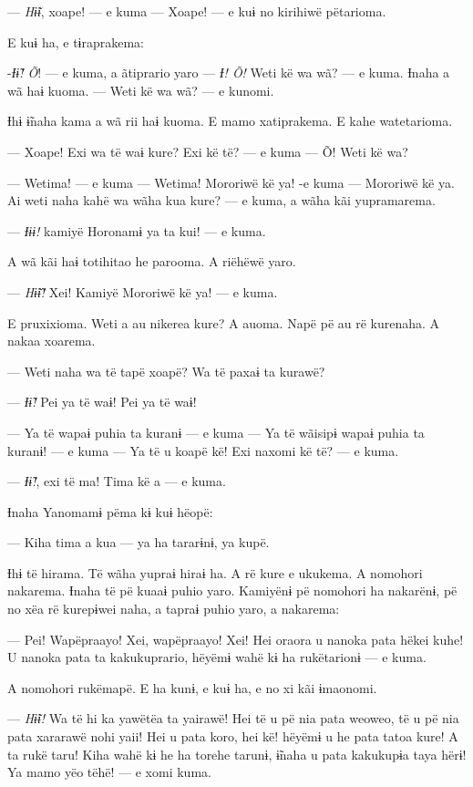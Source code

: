 --- \textit{Hɨ̃ɨ}, xoape! --- e kuma --- Xoape! --- e kuɨ no kirihiwë pëtarioma. 

E kuɨ ha, e tɨraprakema: 

-\textit{Ɨɨ̃! Õ}! --- e kuma, a ãtiprario yaro --- \textit{Ɨ! Õ!} Weti kë wa wã? --- e
kuma. Ɨnaha a wã haɨ kuoma. --- Weti kë wa wã? --- e kunomi. 

Ɨhɨ ɨ̃naha kama a wã rii haɨ kuoma. E mamo xatiprakema. E kahe
watetarioma. 

--- Xoape! Exi wa të waɨ kure? Exi kë të? --- e kuma --- Õ! Weti kë wa?

--- Wetima! --- e kuma --- Wetima! Mororiwë kë ya! -e kuma --- Mororiwë kë
ya. Ai weti naha kahë wa wãha kua kure? --- e kuma, a wãha kãi
yupramarema. 

--- \textit{Ɨɨɨ!} kamiyë Horonamɨ ya ta kui! --- e kuma. 

A wã kãi haɨ totihitao he parooma. A riëhëwë yaro. 

--- \textit{Hɨ̃ɨ̃!} Xei! Kamiyë Mororiwë kë ya! --- e kuma. 

E pruxixioma. Weti a au nikerea kure? A auoma. Napë pë au rë kurenaha. A nakaa xoarema. 

--- Weti naha wa të tapë xoapë? Wa të paxaɨ ta kurawë? 

--- \textit{Ɨɨ̃!} Pei ya të waɨ! Pei ya të waɨ! 

--- Ya të wapaɨ puhia ta kuranɨ --- e kuma --- Ya të wãisipɨ wapaɨ puhia ta
kuranɨ! --- e kuma --- Ya të u koapë kë! Exi naxomi kë të? --- e kuma. 

--- \textit{Ɨɨ̃!}, exi të ma! Tima kë a --- e kuma. 

Ɨnaha Yanomamɨ pëma kɨ kuɨ hëopë: 

--- Kiha tima a kua --- ya ha tararɨnɨ, ya kupë. 

Ɨhɨ të hirama. Të wãha yupraɨ hiraɨ ha. A rë kure e ukukema. A nomohori
nakarema. Ɨnaha të pë kuaaɨ puhio yaro. Kamiyënɨ pë nomohori ha
nakarënɨ, pë no xëa rë kurepɨwei naha, a tapraɨ puhio yaro, a nakarema: 

--- Pei! Wapëpraayo! Xei, wapëpraayo! Xei! Hei oraora u nanoka pata hëkei
kuhe! U nanoka pata ta kakukuprario, hëyëmɨ wahë kɨ ha rukëtarionɨ --- e
kuma. 

A nomohori rukëmapë. E ha kunɨ, e kuɨ ha, e no xi kãi ɨmaonomi. 

--- \textit{Hɨ̃ɨ!} Wa të hi ka yawëtëa ta yairawë! Hei të u pë nia pata weoweo, të u
pë nia pata xararawë nohi yaii! Hei u pata koro, hei kë! hëyëmɨ u he
pata tatoa kure! A ta rukë taru! Kiha wahë kɨ he ha torehe tarunɨ, ɨ̃naha
u pata kakukupɨa taya hërɨ! Ya mamo yëo tëhë! --- e xomi kuma. 

